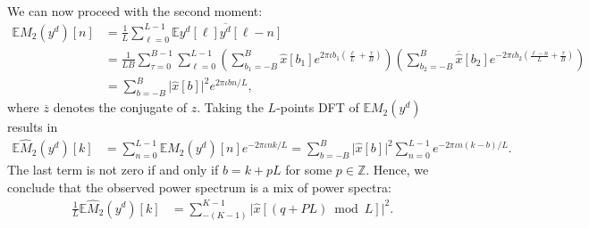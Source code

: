 \documentclass[english,12pt]{article}
\newcommand{\I}{\iota}
\newcommand{\tB}{B}
\newcommand{\hx}{\hat{x}}
\newcommand{\E}{\mathbb{E}}
\numberwithin{equation}{section}
\numberwithin{thm}{section} %
\begin{document}
We can now proceed with the second moment:
\begin{equation} \label{eq:ps}
\begin{split}
\E M_2(y^d)[n] &= \frac{1}{L}\sum_{\ell=0}^{L-1} \E y^d[\ell]\overline{y^d}[\ell-n] \\ &=  \frac{1}{LB}\sum_{\tau=0}^{B-1}\sum_{\ell=0}^{L-1}
\left(\sum_{b_1=-\tB}^{\tB}\hat{x}[b_1]e^{2\pi\I b_1 \left(\frac{\ell}{L} + \frac{\tau}{B}\right)} \right)
\left(\sum_{b_2=-\tB}^{\tB}\overline{\hx}[b_2]e^{-2\pi\I b_2 \left(\frac{\ell-n}{L} + \frac{\tau}{B}\right)} \right) \\
&=
\sum_{b=-\tB}^{\tB}\vert \hat{x}[b]\vert ^2e^{2\pi\I bn/L},
\end{split}
\end{equation}
where $\overline{z}$ denotes the conjugate of $z$.
Taking the $L$-points DFT of $\E M_2(y^d)$ results in
\begin{equation}
\begin{split}
\E \hat{M}_2(y^d)[k] &= \sum_{n=0}^{L-1}\E M_2(y^d)[n]e^{-2\pi\I nk/L} = \sum_{b=-\tB}^{\tB}\vert \hat{x}[b]\vert^2\sum_{n=0}^{L-1}e^{-2\pi\I n(k-b)/L}.
\end{split}
\end{equation}
The last term is not zero if and only if $b = k + pL$ for some $p\in\mathbb{Z}$.  Hence, we conclude that the observed power spectrum is a mix of power spectra:
\begin{equation}
\begin{split}
\frac{1}{L}\E \hat{M}_2(y^d)[k] &=  \sum_{-(K-1)}^{K-1} \vert \hat{x}[(q+PL)\bmod L]\vert^2.
\end{split}
\end{equation}
\end{document}
